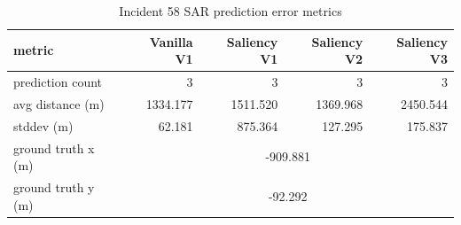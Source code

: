 \begin{table}[ht]
\centering
\caption{Incident 58 SAR prediction error metrics}
\label{tab:sar-incident-58}
\begin{tabular}{lrrrr}
\hline
metric & Vanilla V1 & Saliency V1 & Saliency V2 & Saliency V3 \\
\hline
prediction count & 3 & 3 & 3 & 3 \\
avg distance (m) & 1334.177 & 1511.520 & 1369.968 & 2450.544 \\
stddev (m) & 62.181 & 875.364 & 127.295 & 175.837 \\
ground truth x (m) & \multicolumn{4}{c}{-909.881} \\
ground truth y (m) & \multicolumn{4}{c}{-92.292} \\
\hline
\end{tabular}
\end{table}
